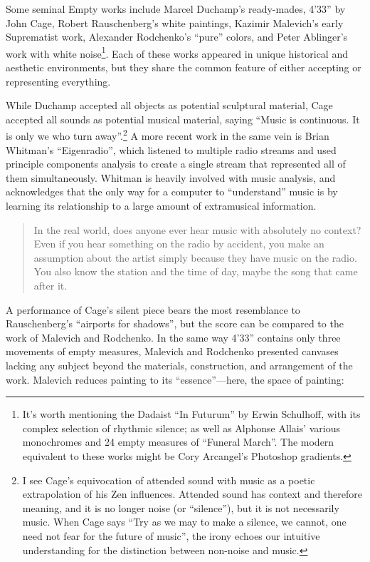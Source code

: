 \documentclass{thesis}
\begin{document}
Some seminal Empty works include Marcel Duchamp's ready-mades, 4'33'' by John Cage\cite{larry_j_solomon_sounds_1998}, Robert Rauschenberg's white paintings, Kazimir Malevich's early Suprematist work\cite{moma_kazimir_2006}, Alexander Rodchenko's ``pure'' colors\cite{moma_rodchenko_1998}, and Peter Ablinger's work with white noise\footnote{It's worth mentioning the Dadaist ``In Futurum'' by   Erwin Schulhoff, with its complex selection of rhythmic silence; as well as Alphonse Allais' various monochromes and 24 empty measures of ``Funeral March''. The modern equivalent to these works might be Cory Arcangel's Photoshop gradients.\cite{cory_arcangel_photoshop_2009}}. Each of these works appeared in unique historical and aesthetic environments, but they share the common feature of either accepting or representing everything.

While Duchamp accepted all objects as potential sculptural material, Cage accepted all sounds as potential musical material, saying ``Music is continuous. It is only we who turn away''.\footnote{I see Cage's equivocation of attended sound with music as a poetic extrapolation of his Zen influences. Attended sound has context and therefore meaning, and it is no longer noise (or ``silence''), but it is not necessarily music. When Cage says ``Try as we may to make a silence, we cannot, one need not fear for the future of music'', the irony echoes our intuitive understanding for the distinction between non-noise and music.} A more recent work in the same vein is Brian Whitman's ``Eigenradio''\cite{brian_whitman_eigenradio_2005}, which listened to multiple radio streams and used principle components analysis to create a single stream that represented all of them simultaneously. Whitman is heavily involved with music analysis, and acknowledges that the only way for a computer to ``understand'' music is by learning its relationship to a large amount of extramusical information.
	
	\begin{quote}
	In the real world, does anyone ever hear music with absolutely no context? Even if you hear something on the radio by accident, you make an assumption about the artist simply because they have music on the radio. You also know the station and the time of day, maybe the song that came after it.
	\end{quote}

A performance of Cage's silent piece bears the most resemblance to Rauschenberg's ``airports for shadows'', but the score can be compared to the work of Malevich and Rodchenko. In the same way 4'33'' contains only three movements of empty measures, Malevich and Rodchenko presented canvases lacking any subject beyond the materials, construction, and arrangement of the work. Malevich reduces painting to its ``essence''---here, the space of painting:
\end{document}
